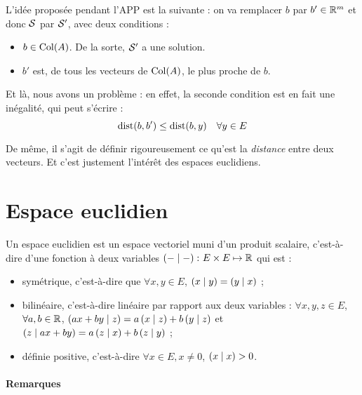L'idée proposée pendant l'APP est la suivante : on va remplacer $b$ par $b' \in \mathbb{R}^{m}$ et donc $\mathcal{S}$ par $\mathcal{S}'$, avec deux conditions :
\begin{itemize}
\item $b \in \mathrm{Col}(A)$. De la sorte, $\mathcal{S}'$ a une solution.
\item $b'$ est, de tous les vecteurs de $\mathrm{Col}(A)$, le plus proche de $b$.
\end{itemize}

Et là, nous avons un problème : en effet, la seconde condition est en fait une inégalité, qui peut s'écrire :
\[ \mathrm{dist}(b, b') \leq \mathrm{dist}(b, y) \quad \forall y \in E \]

De même, il s'agit de définir rigoureusement ce qu'est la \emph{distance} entre deux vecteurs. Et c'est justement l'intérêt des espaces euclidiens.

\section{Espace euclidien}

\begin{defn}

Un espace euclidien est un espace vectoriel muni d'un produit scalaire, c'est-à-dire d'une fonction à deux variables $\left( - \mid - \right) \colon E \times E \mapsto \mathbb{R}$ qui est :
\begin{itemize}
\item symétrique, c'est-à-dire que $\forall x, y \in E$, $\left( x \mid y \right) = \left( y \mid x \right)$ ;
\item bilinéaire, c'est-à-dire linéaire par rapport aux deux variables : $\forall x, y, z \in E$, $\forall a, b \in \mathbb{R}$, $\left( ax+by \mid z \right) = a \left( x \mid z \right) + b \left( y \mid z \right)$ et $ \left( z \mid ax+by \right) = a \left( z \mid x \right) + b \left( z \mid y \right)$ ;
\item définie positive, c'est-à-dire $\forall x \in E, x \neq 0$, $\left( x \mid x \right) > 0$.
\end{itemize}

\end{defn}

\paragraph{Remarques}

